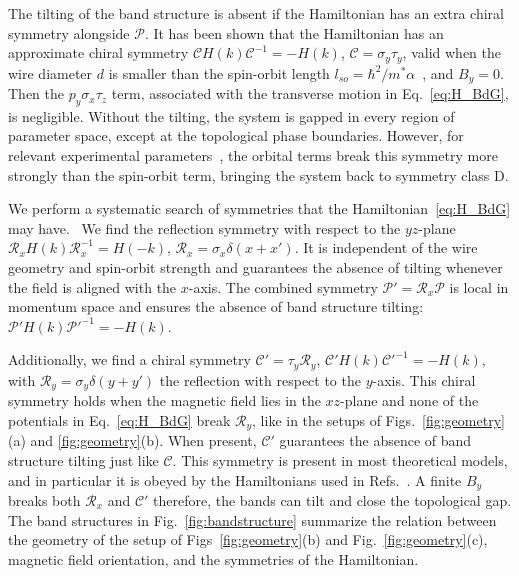 
The tilting of the band structure is absent if the Hamiltonian has an extra chiral symmetry alongside $\mathcal{P}$.
It has been shown that the Hamiltonian has an approximate chiral symmetry $\mathcal{C}H\left(k\right)\mathcal{C}^{-1}=-H\left(k\right)$, $\mathcal{C}=\sigma_y \tau_y$, valid when the wire diameter $d$ is smaller than the spin-orbit length $l_{so}=\hbar^{2}/m^{*}\alpha$~\cite{Tewari2012,Diez2012}, and $B_y=0$.
Then the $p_{y}\sigma_x \tau_z$ term, associated with the transverse motion in Eq.~\eqref{eq:H_BdG}, is negligible.
Without the tilting, the system is gapped in every region of parameter space, except at the topological phase boundaries.
However, for relevant experimental parameters~\cite{Mourik2012}, the orbital terms break this symmetry more strongly than the spin-orbit term, bringing the system back to symmetry class D.


We perform a systematic search of symmetries that the Hamiltonian~\eqref{eq:H_BdG} may have.~\cite{Varjas2018}
We find the reflection symmetry with respect to the $yz$-plane $\mathcal{R}_x H\left(k\right)\mathcal{R}_x^{-1}=H\left(-k\right)$, $\mathcal{R}_x=\sigma_x\delta(x+x')$.
It is independent of the wire geometry and spin-orbit strength and guarantees the absence of tilting whenever the field is aligned with the $x$-axis.
The combined symmetry $\mathcal{P}' = \mathcal{R}_x \mathcal{P}$ is local in momentum space and ensures the absence of band structure tilting: $\mathcal{P}' H(k) \mathcal{P}'^{-1} = -H(k)$.


Additionally, we find a chiral symmetry $\mathcal{C}'=\tau_y\mathcal{R}_y$, $\mathcal{C}'H\left(k\right)\mathcal{C}'^{-1}=-H\left(k\right)$, with $\mathcal{R}_y = \sigma_y \delta(y + y')$ the reflection with respect to the $y$-axis.
This chiral symmetry holds when the magnetic field lies in the $xz$-plane and none of the potentials in Eq.~\eqref{eq:H_BdG} break $\mathcal{R}_y$, like in the setups of Figs.~\ref{fig:geometry}(a) and \ref{fig:geometry}(b).
When present, $\mathcal{C}'$ guarantees the absence of band structure tilting just like $\mathcal{C}$.
This symmetry is present in most theoretical models, and in particular it is obeyed by the Hamiltonians used in Refs.~\cite{Osca2015,Lim2013,Lim2012}.
A finite $B_y$ breaks both $\mathcal{R}_x$ and $\mathcal{C}'$ therefore, the bands can tilt and close the topological gap.
The band structures in Fig.~\ref{fig:bandstructure} summarize the relation between the geometry of the setup of Figs~\ref{fig:geometry}(b) and Fig.~\ref{fig:geometry}(c), magnetic field orientation, and the symmetries of the Hamiltonian.

